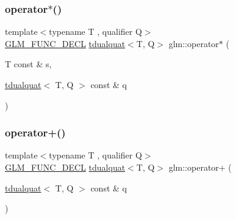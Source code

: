 \mbox{\label{group__gtx__dual__quaternion_gafbd543470cb70432624e046ab85a00e4}} 
\subsubsection{\texorpdfstring{operator$\ast$()}{operator*()}\hspace{0.1cm}{\footnotesize\ttfamily [7/7]}}
{\footnotesize\ttfamily template$<$typename T , qualifier Q$>$ \\
\hyperlink{setup_8hpp_ab2d052de21a70539923e9bcbf6e83a51}{G\+L\+M\+\_\+\+F\+U\+N\+C\+\_\+\+D\+E\+CL} \hyperlink{structglm_1_1tdualquat}{tdualquat}$<$T, Q$>$ glm\+::operator$\ast$ (\begin{DoxyParamCaption}\item[{T const \&}]{s,  }\item[{\hyperlink{structglm_1_1tdualquat}{tdualquat}$<$ T, Q $>$ const \&}]{q }\end{DoxyParamCaption})}

\mbox{\label{group__gtx__dual__quaternion_ga11a89ba9d2bc5ef4ab9bd77ac231fe63}} 
\subsubsection{\texorpdfstring{operator+()}{operator+()}\hspace{0.1cm}{\footnotesize\ttfamily [1/2]}}
{\footnotesize\ttfamily template$<$typename T , qualifier Q$>$ \\
\hyperlink{setup_8hpp_ab2d052de21a70539923e9bcbf6e83a51}{G\+L\+M\+\_\+\+F\+U\+N\+C\+\_\+\+D\+E\+CL} \hyperlink{structglm_1_1tdualquat}{tdualquat}$<$T, Q$>$ glm\+::operator+ (\begin{DoxyParamCaption}\item[{\hyperlink{structglm_1_1tdualquat}{tdualquat}$<$ T, Q $>$ const \&}]{q }\end{DoxyParamCaption})}

